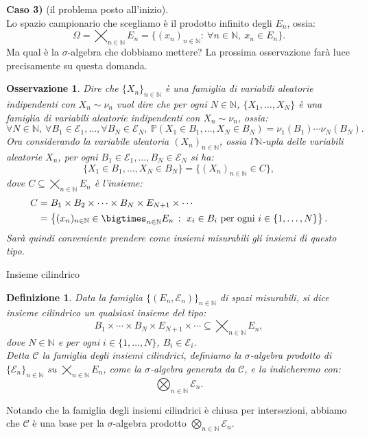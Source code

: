 \documentclass[11pt]{book}
\theoremstyle{Definizione}
\newtheorem*{mydef}{Definizione}
\theoremstyle{TeoremaProposizioneLemmaCorollario}
\theoremstyle{OsservazioneNota}
\newtheorem{myobs}{Osservazione}[section]
\newcommand{\N}{\mathbb{N}}
\renewcommand{\P}{\mathbb{P}}
\begin{document}
\textbf{Caso 3)} (il problema posto all'inizio).\\
Lo spazio campionario che scegliamo è il prodotto infinito degli $E_n$, ossia:
$$
\Omega = \bigtimes_{n\in \N} E_n =  \{(x_n)_{n\in \N}:\ \forall n\in \N,\ x_n\in E_n\}.
$$
Ma qual è la $\sigma$-algebra che dobbiamo mettere? La prossima osservazione farà luce precisamente su questa domanda.
\begin{myobs}
Dire che $\{X_n\}_{n\in\N}$ è una famiglia di variabili aleatorie indipendenti con $X_n\sim \nu_n$ vuol dire che per ogni $N\in \N$, $\{X_1,\dots,X_N\}$ è una famiglia di variabili aleatorie indipendenti con $X_n\sim \nu_n$, ossia:
$$
\forall N\in \N,\ \forall B_1\in \mathcal{E}_1,\dots,\forall B_N\in \mathcal{E}_N,\ \P(X_1\in B_1,\dots,X_N\in B_N) = \nu_1(B_1)\cdots\nu_N(B_N).
$$
Ora considerando la variabile aleatoria $(X_n)_{n\in \N}$, ossia l'$\N$-upla delle variabili aleatorie $X_n$, per ogni $B_1\in \mathcal{E}_1,\dots,B_N\in \mathcal{E}_N$ si ha:
$$
\{X_1\in B_1,\dots,X_N\in B_N\} = \{(X_n)_{n\in \N}\in C \},
$$
dove $C \subseteq \bigtimes_{n\in \N} E_n$ è l'insieme:
\begin{align*}
C &=  B_1\times B_2 \times \cdots \times B_N \times E_{N+1} \times \cdots \\
&= \left\{(x_n)_{n\in \N}\in\bigtimes_{n\in \N} E_n\, :\ x_i\in B_i \textup{ per ogni }i\in \{1,\dots,N\}\right\}.
\end{align*}
Sarà quindi conveniente prendere come insiemi misurabili gli insiemi di questo tipo.
\end{myobs}
\begin{boxdef}{Insieme cilindrico}
\begin{mydef}
Data la famiglia $\{(E_n,\mathcal{E}_n)\}_{n\in \N}$  di spazi misurabili, si dice insieme cilindrico un qualsiasi insieme del tipo:
$$
B_1\times \cdots \times B_N\times E_{N+1}\times \cdots \subseteq \bigtimes_{n\in \N} E_n,
$$
dove $N\in \N$ e per ogni $i\in \{1,\dots,N\}$, $B_i\in \mathcal{E}_i$.\\
Detta $\mathcal{C}$ la famiglia degli insiemi cilindrici, definiamo la $\sigma$-algebra prodotto di $\{\mathcal{E}_n\}_{n\in\N}$ su $\bigtimes_{n\in \N} E_n$, come la $\sigma$-algebra generata da $\mathcal{C}$, e la indicheremo con:
$$
\bigotimes_{n\in \N} \mathcal{E}_n.
$$
\end{mydef}
\end{boxdef}
\noindent
Notando che la famiglia degli insiemi cilindrici è chiusa per intersezioni, abbiamo che $\mathcal{C}$ è una base per la $\sigma$-algebra prodotto $\bigotimes_{n\in \N} \mathcal{E}_n$.\\
\end{document}
